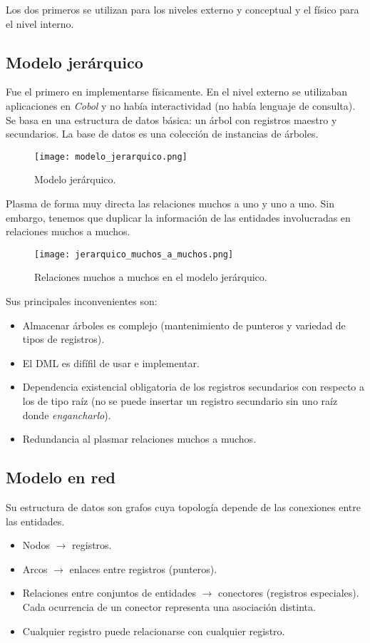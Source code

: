 \documentclass[12pt,spanish]{article}
\numberwithin{definition}{subsection}
\begin{document}
Los dos primeros se utilizan para los niveles externo y conceptual y el físico para el nivel interno.


\subsection{Modelo jerárquico}

Fue el primero en implementarse físicamente. En el nivel externo se utilizaban aplicaciones en \textit{Cobol} y no había interactividad (no había lenguaje de consulta).\\

Se basa en una estructura de datos básica: un árbol con registros maestro y secundarios. La base de datos es una colección de instancias de árboles.


\begin{figure}[H]
\centering
\texttt{[image: modelo\_jerarquico.png]}
\caption{Modelo jerárquico.}
\end{figure}

Plasma de forma muy directa las relaciones muchos a uno y uno a uno. Sin embargo, tenemos que duplicar la información de las entidades involucradas en relaciones muchos a muchos.

\begin{figure}[H]
\centering
\texttt{[image: jerarquico\_muchos\_a\_muchos.png]}
\caption{Relaciones muchos a muchos en el modelo jerárquico.}
\end{figure}

Sus principales inconvenientes son:

\begin{itemize}
	\item Almacenar árboles es complejo (mantenimiento de punteros y variedad de tipos de registros).
	\item El DML es difífil de usar e implementar.
	\item Dependencia existencial obligatoria de los registros secundarios con respecto a los de tipo raíz (no se puede insertar un registro secundario sin uno raíz donde \emph{engancharlo}).
	\item Redundancia al plasmar relaciones muchos a muchos.
\end{itemize}

\subsection{Modelo en red}

Su estructura de datos son grafos cuya topología depende de las conexiones entre las entidades.
\begin{itemize}
	\item Nodos $\rightarrow$ registros.
	\item Arcos $\rightarrow$ enlaces entre registros (punteros).
	\item Relaciones entre conjuntos de entidades $\rightarrow$ conectores (registros especiales). Cada ocurrencia de un conector representa una asociación distinta.
	\item Cualquier registro puede relacionarse con cualquier registro.
\end{itemize}
\end{document}
